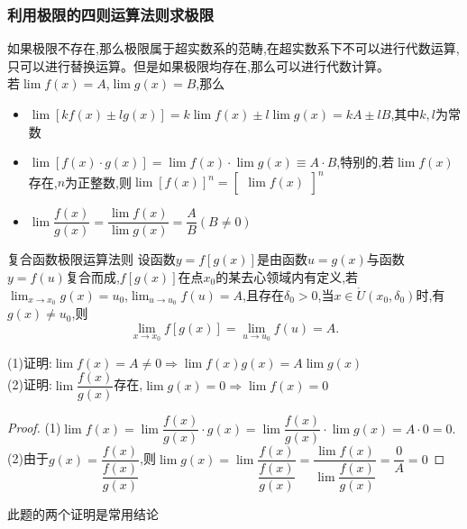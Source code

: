 \documentclass[10pt, a4paper, oneside, UTF8]{ctexbook}
\begin{document}
\begin{sloppypar}
    \subsubsection{利用极限的四则运算法则求极限}
    如果极限不存在,那么极限属于超实数系的范畴,在超实数系下不可以进行代数运算,只可以进行替换运算。但是如果极限均存在,那么可以进行代数计算。\\
    若$\lim f(x)=A$,$\lim g(x)=B$,那么
    \begin{itemize}
        \item $\operatorname*{lim}[kf(x)\pm lg(x)]=k\operatorname*{lim}f(x)\pm l\operatorname*{lim}g(x)=kA\pm lB$,其中$k,l$为常数
        \item $\operatorname*{lim}[f(x)\cdot g(x)]=\operatorname*{lim}f(x)\cdot\operatorname*{lim}g(x)\equiv A\cdot B$,特别的,若$\lim f(x)$存在,$n$为正整数,则$\operatorname{lim}[f(x)]^n=\begin{bmatrix}\operatorname{lim}f(x)\end{bmatrix}^n$
        \item $\operatorname*{lim}\dfrac{f(x)}{g(x)}=\dfrac{\operatorname*{lim}f(x)}{\operatorname*{lim}g(x)}=\dfrac{A}{B}(B\neq0)$
    \end{itemize}
    \begin{defn}{复合函数极限运算法则}{}
        设函数$y=f[g(x)]$是由函数$u=g(x)$与函数$y=f(u)$复合而成,$f[g(x)]$在点$x_0$的某去心领域内有定义,若$\lim_{x \to  x_0} g(x)=u_0$,$\lim_{u \to u_0}f(u)=A$,且存在$\delta_0 >0$,当$x\in\mathring{U}\left(x_{0},\delta_{0}\right)$时,有$g\left(x\right)\neq u_{0}$,则
        $$
            \underset{x\to x_0}{\operatorname*{lim}}f[g(x)]=\underset{u\to u_0}{\operatorname*{lim}}f(u)=A.
        $$
    \end{defn}
    \begin{problem}
        (1)证明:$\lim f(x)=A \neq 0 \Rightarrow \lim f(x)g(x)=A \lim g(x)$\\
        (2)证明:$\lim \dfrac{f(x)}{g(x)}$存在,$\lim g(x)=0 \Rightarrow \lim f(x)=0$
    \end{problem}
    \begin{proof}
        (1)$\lim f(x)=\lim\dfrac{f(x)}{g(x)}\cdot g(x)=\lim\dfrac{f(x)}{g(x)}\cdot\lim g(x)=A\cdot0=0.$
        \\
        (2)由于$g(x)=\dfrac{f(x)}{\dfrac{f(x)}{g(x)}}$,则$\lim g(x)=\lim\dfrac{f(x)}{\dfrac{f(x)}{g(x)}}=\dfrac{\lim f(x)}{\lim\dfrac{f(x)}{g(x)}}=\dfrac{0}{A}=0$ 
    \end{proof}
    \begin{note}
        此题的两个证明是常用结论

\end{note}
\end{sloppypar}
\end{document}
